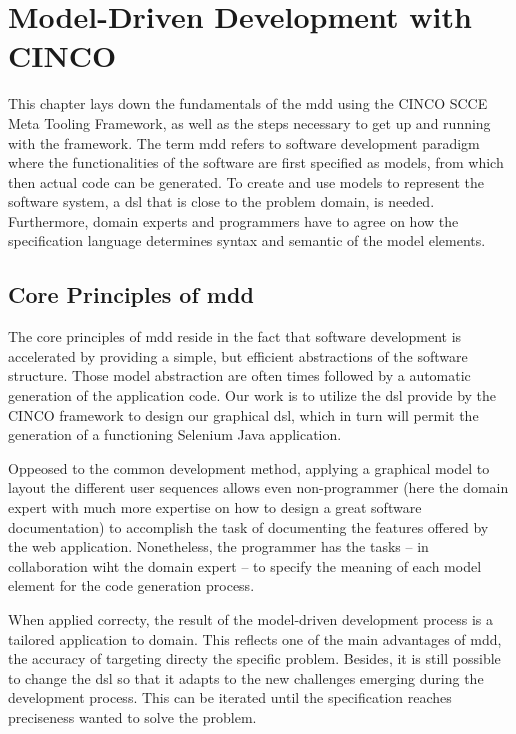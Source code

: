 
\chapter{Model-Driven Development with CINCO}\label{ch:Basis}

This chapter lays down the fundamentals of the \acrfull{mdd} using the CINCO SCCE Meta Tooling Framework, as well as the steps necessary to get up and running with the framework.
The term \acrshort{mdd} refers to software development paradigm where the functionalities of the software are first specified as models, from which then actual code can be generated.
To create and use models to represent the software system, a \acrfull{dsl} that is close to the problem domain, is needed. Furthermore, domain experts and programmers have to agree on how the specification language determines syntax and semantic of the model elements.

\section[CoreMDD]{Core Principles of \acrshort{mdd}}

The core principles of \acrshort{mdd} reside in the fact that software development is accelerated by providing a simple, but efficient abstractions of the software structure. Those model abstraction are often times followed by a automatic generation of the application code. Our work is to utilize the \acrshort{dsl} provide by the CINCO framework to design our graphical \acrshort{dsl}, which in turn will permit the generation of a functioning \gls{Selenium} Java application.

Oppeosed to the common development method, applying a graphical model to layout the different user sequences allows even non-programmer (here the domain expert with much more expertise on how to design a great software documentation) to accomplish the task of documenting the features offered by the web application. Nonetheless, the programmer has the tasks -- in collaboration wiht the domain expert -- to specify the meaning of each model element for the code generation process.

When applied correcty, the result of the model-driven development process is a tailored application to domain. This reflects one of the main advantages of \acrshort{mdd}, the accuracy of targeting directy the specific problem. Besides, it is still possible to change the \acrshort{dsl} so that it adapts to the new challenges emerging during the development process. This can be iterated until the specification reaches preciseness wanted to solve the problem.


